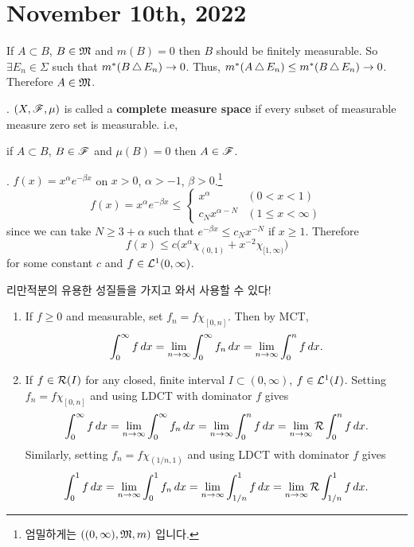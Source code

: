 \section*{November 10th, 2022}

\rmk If \(A \subset B\), \(B \in \mathfrak{M}\) and \(m(B) = 0\) then \(B\) should be finitely measurable. So \(\exists E_n \in \Sigma\) such that \(m^\ast(B\operatorname{\triangle} E_n) \rightarrow 0\). Thus, \(m^\ast(A \operatorname{\triangle} E_n) \leq m^\ast(B\operatorname{\triangle} E_n) \rightarrow 0\). Therefore \(A \in \mathfrak{M}\).

.  \((X, \mathscr{F}, \mu)\) is called a \textbf{complete measure space} if every subset of measurable measure zero set is measurable. i.e,
\begin{center}
    if \(A \subset B\), \(B \in \mathscr{F}\) and \(\mu(B) = 0\) then \(A \in \mathscr{F}\).
\end{center}

\ex. \(f(x) = x^{\alpha} e^{-\beta x}\) on \(x > 0\), \(\alpha > - 1\), \(\beta > 0\).\footnote{엄밀하게는 \(((0, \infty), \mathfrak{M}, m)\) 입니다.}
\[
    f(x) = x^\alpha e^{-\beta x} \leq \begin{cases}
        x^\alpha & (0 < x < 1) \\ c_N x^{\alpha - N} & (1 \leq x < \infty)
    \end{cases}
\]
since we can take \(N \geq 3 + \alpha\) such that \(e^{-\beta x} \leq c_N x^{-N}\) if \(x \geq 1\). Therefore
\[
    f(x) \leq c\bigl(x^\alpha \chi_{(0, 1)} + x^{-2} \chi_{[1, \infty)}\bigr)
\]
for some constant \(c\) and \(f \in \mathcal{L}^{1}(0, \infty)\).

\rmk 리만적분의 유용한 성질들을 가지고 와서 사용할 수 있다!
\begin{enumerate}
    \item If \(f \geq 0\) and measurable, set \(f_n = f\chi_{[0, n]}\). Then by MCT,
          \[
              \int_0^\infty f \,d{x} = \lim_{n \rightarrow \infty} \int_0^\infty f_n \,d{x} = \lim_{n \rightarrow \infty} \int_0^n f \,d{x}.
          \]
    \item If \(f \in \mathcal{R}(I)\) for any closed, finite interval \(I \subset (0, \infty)\), \(f \in \mathcal{L}^{1}(I)\). Setting \(f_n = f\chi_{[0, n]}\) and using LDCT with dominator \(f\) gives
          \[
              \int_0^\infty f \,d{x} = \lim_{n \rightarrow \infty} \int_0^\infty f_n \,d{x} = \lim_{n \rightarrow \infty} \int_0^n f \,d{x} = \lim_{n \rightarrow \infty} \mathcal{R} \int_0^n f \,d{x}.
          \]
          Similarly, setting \(f_n = f\chi_{(1/n, 1)}\) and using LDCT with dominator \(f\) gives
          \[
              \int_0^1 f\,d{x} = \lim_{n \rightarrow \infty} \int_{0}^1 f_n \,d{x} = \lim_{n \rightarrow \infty}\int_{1/n}^1 f \,d{x} = \lim_{n \rightarrow \infty} \mathcal{R}\int_{1/n}^1 f \,d{x}.
          \]
\end{enumerate}

